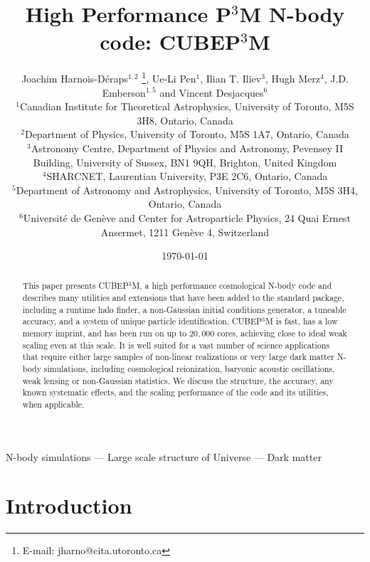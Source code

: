 \documentclass[useAMS,usenatbib]{mn2e}
\title[{\small}  High Performance P$^{3}$M N-body code: CUBEP$^3$M]{{\small} High Performance P$^{3}$M N-body code: CUBEP$^3$M}
\author[Joachim Harnois-D\'{e}raps, Ue-Li Pen, Ilian T. Iliev, Hugh Merz, J.D. Emberson, Vincent Desjacques]{Joachim Harnois-D\'{e}raps$^{1,2}$ 
\thanks{E-mail: jharno@cita.utoronto.ca},  Ue-Li Pen$^{1}$, 
Ilian T. Iliev$^{3}$, Hugh Merz$^{4}$, \newauthor
J.D. Emberson$^{1,5}$ and Vincent Desjacques$^{6}$\\
$^{1}$Canadian Institute for Theoretical Astrophysics, University of
Toronto, M5S 3H8, Ontario, Canada\\
$^{2}$Department of Physics, University of Toronto, M5S 1A7, Ontario,  Canada\\
$^{3}$Astronomy Centre, Department of Physics and Astronomy, Pevensey II Building, University of Sussex, BN1 9QH, Brighton, United Kingdom\\
$^{4}$SHARCNET, Laurentian University, P3E 2C6, Ontario, Canada\\
$^{5}$Department of Astronomy and Astrophysics, University of Toronto, M5S 3H4, Ontario, Canada\\
$^{6}$Universit\'{e} de Gen\`{e}ve and Center for Astroparticle Physics, 24 Quai Ernest Ansermet, 1211 Gen\`{e}ve 4, Switzerland}
\begin{document}
\date{\today}

\pagerange{\pageref{firstpage}--\pageref{lastpage}} 

\maketitle

\label{firstpage}

\begin{abstract}
This paper presents {\small CUBEP$^3$M}, a high performance cosmological N-body code
and describes many utilities and extensions that have been added to the standard package, including a runtime halo finder,
a non-Gaussian initial conditions generator, a tuneable accuracy, and a system of unique particle identification.
{\small CUBEP$^3$M} is fast, has a low memory imprint, and 
has been run on up to $20,000$ cores, achieving close to ideal weak scaling
even at this scale.
It is well suited for a vast number of science applications that 
require either large samples of non-linear realizations or 
very large dark matter N-body simulations,
including  cosmological reionization, baryonic acoustic oscillations, weak lensing or
non-Gaussian statistics.
We discuss the structure, the accuracy, any known systematic effects, and the scaling performance
of the code and its utilities, when applicable.
\end{abstract}

\begin{keywords}
N-body simulations --- Large scale structure of Universe --- Dark matter
\end{keywords}


\section{Introduction}
\end{document}
